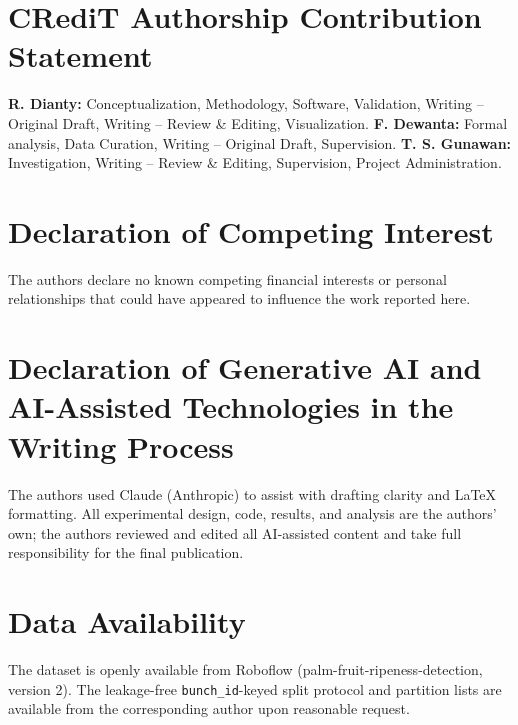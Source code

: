 \documentclass[twocolumn,a4paper,10pt]{article}
\begin{document}
\section*{CRediT Authorship Contribution Statement}
\textbf{R. Dianty:} Conceptualization, Methodology, Software, Validation,
Writing -- Original Draft, Writing -- Review \& Editing, Visualization.
\textbf{F. Dewanta:} Formal analysis, Data Curation, Writing -- Original Draft,
Supervision. \textbf{T. S. Gunawan:} Investigation, Writing -- Review \&
Editing, Supervision, Project Administration.

\section*{Declaration of Competing Interest}
The authors declare no known competing financial interests or personal
relationships that could have appeared to influence the work reported here.

\section*{Declaration of Generative AI and AI-Assisted Technologies in the Writing Process}
The authors used Claude (Anthropic) to assist with drafting clarity and LaTeX
formatting. All experimental design, code, results, and analysis are the
authors' own; the authors reviewed and edited all AI-assisted content and take
full responsibility for the final publication.

\section*{Data Availability}
The dataset is openly available from Roboflow (palm-fruit-ripeness-detection,
version 2). The leakage-free \texttt{bunch\_id}-keyed split protocol and
partition lists are available from the corresponding author upon reasonable
request.

\end{document}
